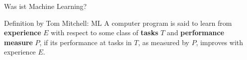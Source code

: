 \documentclass[hyperref={pdfpagelabels=false},usepdftitle=false]{beamer}
\begin{document}

\title{\titleText}
\author{ML-KA}
\date{16. Juli 2015}  %
\subject{Machine Learning}

\frame{\titlepage}


\begin{frame}{Was ist Machine Learning?}
    \begin{block}{Definition by Tom Mitchell: ML}
        A computer program is said to learn from \textbf{experience} $E$ with
        respect to some class of \textbf{tasks} $T$ and \textbf{performance
        measure} $P$, if its performance at tasks in $T$, as measured by $P$,
        improves with experience $E$.
    \end{block}
\end{frame}





\end{document}
